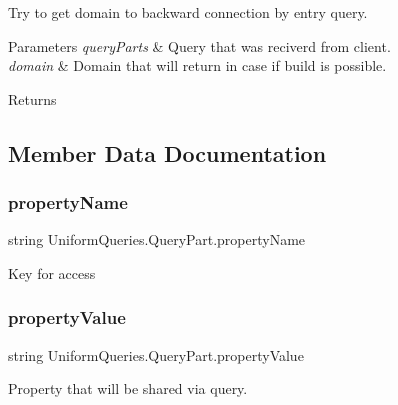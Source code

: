 Try to get domain to backward connection by entry query. 


\begin{DoxyParams}{Parameters}
{\em query\+Parts} & Query that was reciverd from client.\\
\hline
{\em domain} & Domain that will return in case if build is possible.\\
\hline
\end{DoxyParams}
\begin{DoxyReturn}{Returns}

\end{DoxyReturn}


\subsection{Member Data Documentation}
\mbox{\label{struct_uniform_queries_1_1_query_part_a941540a3d1489c7f32cb5e21910ba7ac}} 
\subsubsection{\texorpdfstring{property\+Name}{propertyName}}
{\footnotesize\ttfamily string Uniform\+Queries.\+Query\+Part.\+property\+Name}



Key for access 

\mbox{\label{struct_uniform_queries_1_1_query_part_adb297c368ab4900f751d60ceffda0a99}} 
\subsubsection{\texorpdfstring{property\+Value}{propertyValue}}
{\footnotesize\ttfamily string Uniform\+Queries.\+Query\+Part.\+property\+Value}



Property that will be shared via query. 



